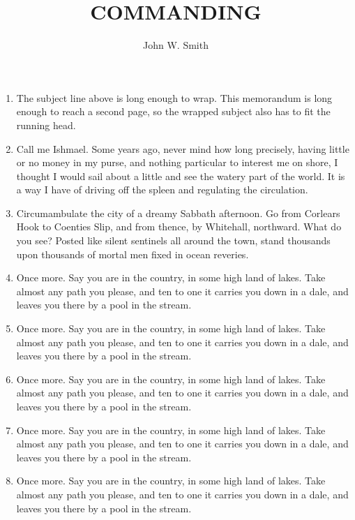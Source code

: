 \documentclass{../armymemo}
\author{John W. Smith}\rank{CPT}\branch{CY}
\title{COMMANDING}
\begin{document}
\begin{enumerate}
	\item The subject line above is long enough to wrap. This memorandum is long enough
	      to reach a second page, so the wrapped subject also has to fit the running head.
	\item Call me Ishmael. Some years ago, never mind how long precisely, having little
	      or no money in my purse, and nothing particular to interest me on shore, I thought
	      I would sail about a little and see the watery part of the world. It is a way I
	      have of driving off the spleen and regulating the circulation.
	\item Circumambulate the city of a dreamy Sabbath afternoon. Go from Corlears Hook
	      to Coenties Slip, and from thence, by Whitehall, northward. What do you see? Posted
	      like silent sentinels all around the town, stand thousands upon thousands of mortal
	      men fixed in ocean reveries.
	\item Once more. Say you are in the country, in some high land of lakes. Take almost
	      any path you please, and ten to one it carries you down in a dale, and leaves you
	      there by a pool in the stream.
	\item Once more. Say you are in the country, in some high land of lakes. Take almost
	      any path you please, and ten to one it carries you down in a dale, and leaves you
	      there by a pool in the stream.
	\item Once more. Say you are in the country, in some high land of lakes. Take almost
	      any path you please, and ten to one it carries you down in a dale, and leaves you
	      there by a pool in the stream.
	\item Once more. Say you are in the country, in some high land of lakes. Take almost
	      any path you please, and ten to one it carries you down in a dale, and leaves you
	      there by a pool in the stream.
	\item Once more. Say you are in the country, in some high land of lakes. Take almost
	      any path you please, and ten to one it carries you down in a dale, and leaves you
	      there by a pool in the stream.
\end{enumerate}
\end{document}
